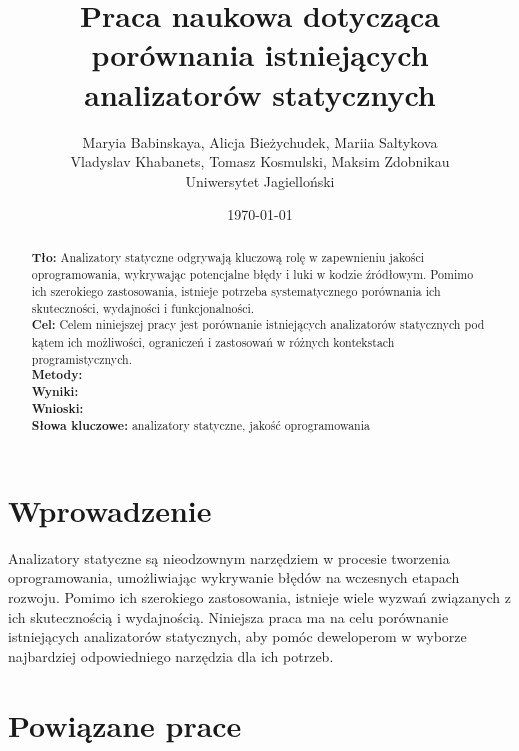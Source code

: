 \documentclass[a4paper,12pt]{article}
\title{Praca naukowa dotycząca porównania istniejących analizatorów statycznych}
\author{Maryia Babinskaya, Alicja Bieżychudek, Mariia Saltykova \\ Vladyslav Khabanets, Tomasz Kosmulski, Maksim Zdobnikau \\ Uniwersytet Jagielloński}
\date{\today}
\begin{document}
\maketitle

\begin{abstract}
\noindent
\textbf{Tło:} Analizatory statyczne odgrywają kluczową rolę w zapewnieniu jakości oprogramowania, wykrywając potencjalne błędy i luki w kodzie źródłowym. Pomimo ich szerokiego zastosowania, istnieje potrzeba systematycznego porównania ich skuteczności, wydajności i funkcjonalności.\\
\textbf{Cel:} Celem niniejszej pracy jest porównanie istniejących analizatorów statycznych pod kątem ich możliwości, ograniczeń i zastosowań w różnych kontekstach programistycznych.\\
\textbf{Metody:} \\
\textbf{Wyniki:} \\
\textbf{Wnioski:} \\
\vspace{0.5cm}
\noindent
\textbf{Słowa kluczowe:} analizatory statyczne, jakość oprogramowania
\end{abstract}

\section{Wprowadzenie}
Analizatory statyczne są nieodzownym narzędziem w procesie tworzenia oprogramowania, umożliwiając wykrywanie błędów na wczesnych etapach rozwoju. Pomimo ich szerokiego zastosowania, istnieje wiele wyzwań związanych z ich skutecznością i wydajnością. Niniejsza praca ma na celu porównanie istniejących analizatorów statycznych, aby pomóc deweloperom w wyborze najbardziej odpowiedniego narzędzia dla ich potrzeb.

\section{Powiązane prace}

\end{document}

